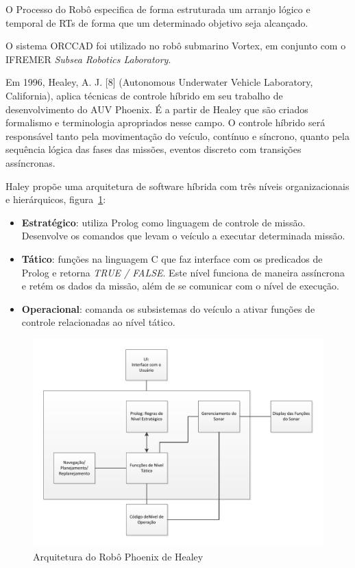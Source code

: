 O Processo do Robô especifica de forma estruturada um arranjo lógico e temporal
de RTs de forma que um determinado objetivo seja alcançado.

O sistema ORCCAD foi utilizado no robô submarino Vortex, em conjunto com o
IFREMER \emph{Subsea Robotics Laboratory}.

Em 1996, Healey, A. J. [8] (Autonomous Underwater Vehicle Laboratory,
California), aplica técnicas de controle híbrido em seu trabalho de
desenvolvimento do AUV Phoenix.  É a partir de Healey
que são criados formalismo e terminologia apropriados nesse campo. O
controle híbrido será responsável tanto pela movimentação do veículo, contínuo
e síncrono, quanto pela sequência lógica das fases das missões, eventos
discreto com transições assíncronas.  

Haley propõe uma arquitetura de software híbrida com três níveis organizacionais
e hierárquicos, figura~\ref{HEALEY_1}: 
\begin{itemize}
  \item \textbf{Estratégico}: utiliza Prolog como linguagem de controle de
  missão. Desenvolve os comandos que levam o veículo a executar determinada
  missão.
  \item \textbf{Tático}: funções na linguagem C que faz interface com os
  predicados de Prolog e retorna \emph{TRUE / FALSE}. Este nível funciona de
  maneira assíncrona e retém os dados da missão, além de se comunicar com o
  nível de execução.
  \item \textbf{Operacional}: comanda os subsistemas do veículo a ativar funções
  de controle relacionadas ao nível tático.
\end{itemize}

\begin{figure}[H]
\centering
\includegraphics[width=1\columnwidth]{figs/HEALEY_1.pdf}
\caption{Arquitetura do Robô Phoenix de Healey}
\label{HEALEY_1}
\end{figure}

